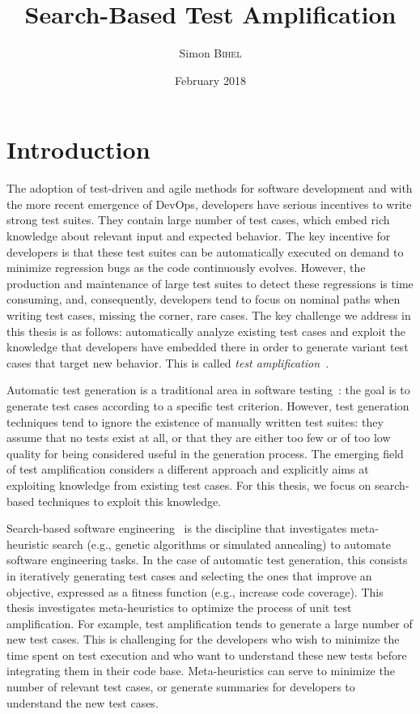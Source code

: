 \documentclass[11pt]{sdm}
\title{Search-Based Test Amplification}
\author{Simon \textsc{Bihel}}
\date{February 2018}
\begin{document}
\maketitle

\section*{Introduction}
\label{intro}
The adoption of test-driven and agile methods for software development and with the more recent emergence of DevOps, developers have serious incentives to write strong test suites.
They contain large number of test cases, which embed rich knowledge about relevant input and expected behavior.
The key incentive for developers is that these test suites can be automatically executed on demand to minimize regression bugs as the code continuously evolves.
However, the production and maintenance of large test suites to detect these regressions is time consuming, and, consequently, developers tend to focus on nominal paths when writing test cases, missing the corner, rare cases.
The key challenge we address in this thesis is as follows: automatically analyze existing test cases and exploit the knowledge that developers have embedded there in order to generate variant test cases that target new behavior.
This is called \emph{test amplification}~\cite{danglot2017emerging}.

Automatic test generation is a traditional area in software testing~\cite{mcminn2011search}: the goal is to generate test cases according to a specific test criterion.
However, test generation techniques tend to ignore the existence of manually written test suites: they assume that no tests exist at all, or that they are either too few or of too low quality for being considered useful in the generation process.
The emerging field of test amplification considers a different approach and explicitly aims at exploiting knowledge from existing test cases.
For this thesis, we focus on search-based techniques to exploit this knowledge.

Search-based software engineering~\cite{harman2001search} is the discipline that investigates meta-heuristic search (e.g., genetic algorithms or simulated annealing) to automate software engineering tasks.
In the case of automatic test generation, this consists in iteratively generating test cases and selecting the ones that improve an objective, expressed as a fitness function (e.g., increase code coverage).
This thesis investigates meta-heuristics to optimize the process of unit test amplification.
For example, test amplification tends to generate a large number of new test cases.
This is challenging for the developers who wish to minimize the time spent on test execution and who want to understand these new tests before integrating them in their code base.
Meta-heuristics can serve to minimize the number of relevant test cases, or generate summaries for developers to understand the new test cases.
\end{document}
